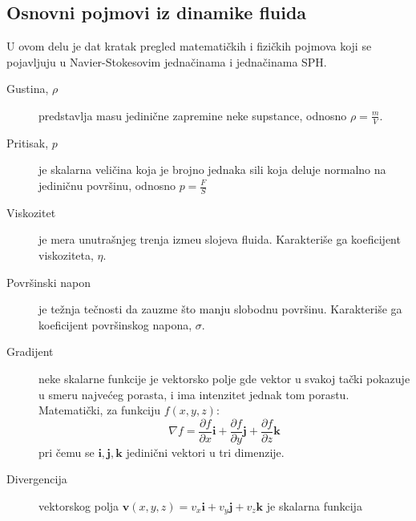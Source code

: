 \documentclass[12pt]{article}
\renewcommand{\vec}[1]{\mathbf{#1}}
\begin{document}
    \subsection{Osnovni pojmovi iz dinamike fluida}
        U ovom delu je dat kratak pregled matemati\v ckih i fizi\v ckih pojmova koji se pojavljuju u Navier-Stokesovim jedna\v cinama i jedna\v cinama SPH.
        \label{definicije}
        \begin{description}
          \item[Gustina, $\rho$] predstavlja masu jedini\v cne zapremine neke supstance, odnosno $\rho = \frac{m}{V}$.
          \item[Pritisak, $p$] je skalarna veli\v cina koja je brojno jednaka sili koja deluje normalno na jedini\v cnu povr\v sinu, odnosno $p = \frac{F}{S}$
          \item[Viskozitet] je mera unutra\v snjeg trenja izme\dj u slojeva fluida. Karakteri\v se ga koeficijent viskoziteta, $\eta$.
          \item[Povr\v sinski napon] je te\v znja te\v cnosti da zauzme \v sto manju slobodnu povr\v sinu. Karakteri\v se ga koeficijent povr\v sinskog napona, $\sigma$.
          \item[Gradijent] neke skalarne funkcije je vektorsko polje gde vektor u svakoj ta\v cki pokazuje u smeru najve\'ceg porasta, i ima intenzitet jednak tom porastu. Matemati\v cki, za funkciju $f(x, y, z)$:
                \begin{equation}\label{eq:definicija gradijenta}
                \nabla f=\frac{\partial f}{\partial x}\vec{i} + \frac{\partial f}{\partial y}\vec{j} + \frac{\partial f}{\partial z}\vec{k}
                \end{equation}
                pri \v cemu se $\vec{i}, \vec{j}, \vec{k}$ jedini\v cni vektori u tri dimenzije.
          \item[Divergencija] vektorskog polja $\vec{v}(x, y, z)=v_x\vec{i}+v_y\vec{j}+v_z\vec{k}$ je skalarna funkcija

\end{description}
\end{document}
